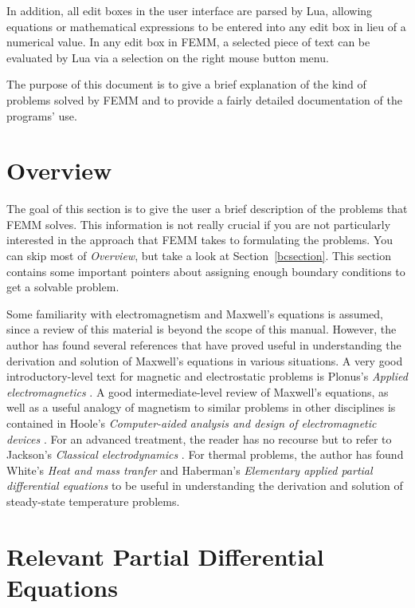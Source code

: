 \documentclass[12pt]{report}
\begin{document}
In addition, all edit boxes in the user interface are parsed by
Lua, allowing equations or mathematical expressions to be entered
into any edit box in lieu of a numerical value.  In any edit box in
FEMM, a selected piece of text can be evaluated by Lua via a
selection on the right mouse button menu.

The purpose of this document is to give a brief explanation of the
kind of problems solved by FEMM and to provide a fairly detailed
documentation of the programs' use.

\section{Overview}

The goal of this section is to give the user a brief description of
the problems that FEMM solves.  This information is not really
crucial if you are not particularly interested in the approach that
FEMM takes to formulating the problems.  You can skip most of {\em
Overview}, but take a look at Section~\ref{bcsection}.  This
section contains some important pointers about assigning enough
boundary conditions to get a solvable problem.

Some familiarity with electromagnetism and Maxwell's equations is
assumed, since a review of this material is beyond the scope of
this manual. However, the author has found several references that
have proved useful in understanding the derivation and solution of
Maxwell's equations in various situations.  A very good
introductory-level text for magnetic and electrostatic problems
is Plonus's {\em Applied electromagnetics}
\cite{Plonus}. A good intermediate-level review of Maxwell's
equations, as well as a useful analogy of magnetism to similar
problems in other disciplines is contained in Hoole's {\em
Computer-aided analysis and design of electromagnetic devices}
\cite{Hoole}.  For an advanced treatment, the reader has no
recourse but to refer to Jackson's {\em Classical electrodynamics}
\cite{Jackson}.  For thermal problems, the author has found
White's {\em Heat and mass tranfer} \cite{FrankWhite} and 
Haberman's {\em Elementary applied partial differential equations}
\cite{Haberman} to be useful in understanding the derivation and solution of
steady-state temperature problems.  

\section{Relevant Partial Differential Equations}
\end{document}
